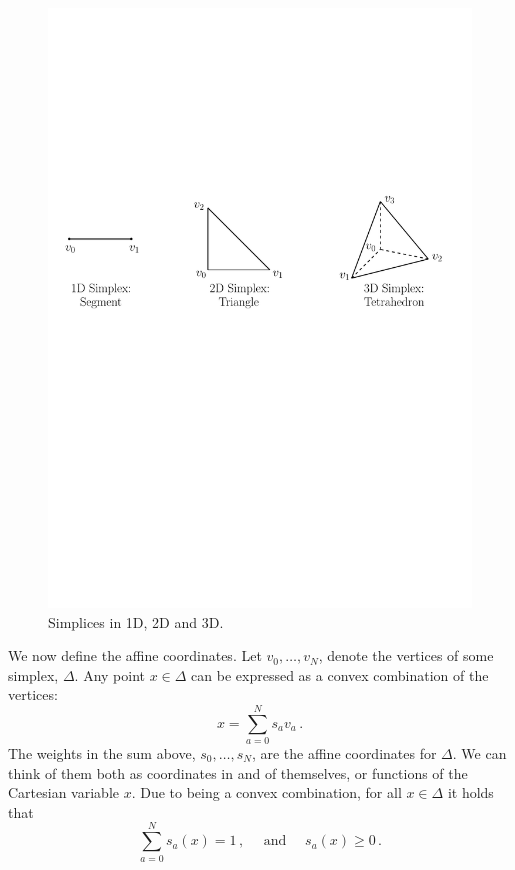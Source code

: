 \begin{figure}[!ht]
\begin{center}
\includegraphics[scale=0.58]{./figures/AffineSimplices.pdf}
\caption{Simplices in 1D, 2D and 3D.}
\label{fig:affinesimplices}
\end{center}
\end{figure}

We now define the affine coordinates.
Let $ v_0,\ldots, v_N$, denote the vertices of some simplex, $\Delta$.
Any point $ x\in\Delta$ can be expressed as a convex combination of the vertices:
\begin{equation}
 x = \sum_{a=0}^N s_a v_a\, .\label{eq:affinerepresentation}
\end{equation}
The weights in the sum above, $s_0,\ldots,s_N$, are the affine coordinates for $\Delta$.
We can think of them both as coordinates in and of themselves, or functions of the Cartesian variable $x$. 
Due to being a convex combination, for all $x\in\Delta$ it holds that
\begin{equation}
\sum_{a=0}^N s_a(x)=1\,,\quad\text{ and }\quad s_a(x)\geq0\,.\label{eq:affinesumtoone}
\end{equation}

